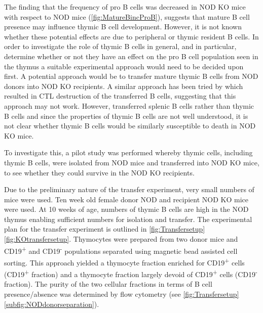 The finding that the frequency of pro B cells was decreased in NOD KO mice with respect to NOD mice (\cref{fig:MatureBincProB}), suggests that mature B cell presence may influence thymic B cell development.
However, it is not known whether these potential effects are due to peripheral or thymic resident B cells.
In order to investigate the role of thymic B cells in general, and in particular, determine whether or not they have an effect on the pro B cell population seen in the thymus a suitable experimental approach would need to be decided upon first.
A potential approach would be to transfer mature thymic B cells from NOD donors into NOD KO recipients.
A similar approach has been tried by \citet{Serreze1998} which resulted in CTL destruction of the transferred B cells, suggesting that this approach may not work.
However, \citet{Serreze1998} transferred splenic B cells rather than thymic B cells and since the properties of thymic B cells are not well understood, it is not clear whether thymic B cells would be similarly susceptible to death in NOD KO mice.

To investigate this, a pilot study was performed whereby thymic cells, including thymic B cells, were isolated from NOD mice and transferred into NOD KO mice, to see whether they could survive in the NOD KO recipients.

Due to the preliminary nature of the transfer experiment, very small numbers of mice were used.
Ten week old female donor NOD and recipient NOD KO mice were used.
At 10 weeks of age, numbers of thymic B cells are high in the NOD thymus enabling sufficient numbers for isolation and transfer.
The experimental plan for the transfer experiment is outlined in \cref{fig:Transfersetup}\ref{fig:KOtransfersetup}.
Thymocytes were prepared from two donor mice and CD19\textsuperscript{+} and CD19\textsuperscript{-} populations separated using magnetic bead assisted cell sorting.
This approach yielded a thymocyte fraction enriched for CD19\textsuperscript{+} cells (CD19\textsuperscript{+} fraction) and a thymocyte fraction largely devoid of CD19\textsuperscript{+} cells (CD19\textsuperscript{-} fraction).
The purity of the two cellular fractions in terms of B cell presence/absence was determined by flow cytometry (see \cref{fig:Transfersetup}\ref{subfig:NODdonorseparation}).


